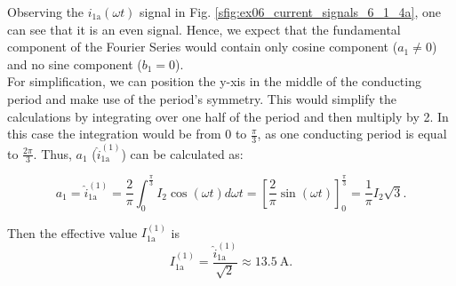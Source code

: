     \begin{solutionblock}
        
    \end{solutionblock}
    \begin{solutionblock}
        Observing the $i_\mathrm{1a}(\omega t)$ signal in Fig. \ref{sfig:ex06_current_signals_6_1_4a}, one can see that it is an even signal. Hence, we expect that the fundamental component of the Fourier Series
        would contain only cosine component ($a_1 \neq 0$) and no sine component ($b_1 = 0$). 
        \\
        For simplification, we can position the y-xis in the middle of the conducting period and make use of the period's symmetry. This would simplify the calculations
        by integrating over one half of the period and then multiply by 2. In this case the integration would be from 0 to $\frac{\pi}{3}$, as one conducting
        period is equal to $\frac{2\pi}{3}$. Thus, $a_1$ ($\hat{i}^\mathrm{(1)}_\mathrm{1a}$) can be calculated as:

        \begin{equation}
            a_1 = \hat{i}^\mathrm{(1)}_\mathrm{1a} = \frac{2}{\pi}\int_{0}^{\frac{\pi}{3}}I_\mathrm{2}\cos(\omega t) d\omega t = \left[\frac{2}{\pi} \sin(\omega t)\right]^{\frac{\pi}{3}}_{0} = \frac{1}{\pi}I_\mathrm{2}\sqrt{3}.
            \label{sub6.1.4:eq:calculate_a1}
        \end{equation}  
        
        Then the effective value $I^\mathrm{(1)}_\mathrm{1a}$ is
            \begin{equation}
                I^\mathrm{(1)}_\mathrm{1a} = \frac{\hat{i}^\mathrm{(1)}_\mathrm{1a}}{\sqrt{2}} \approx \SI{13.5}{\ampere}.
                \label{sub6.1.4:eq:calculate_I_rms}
            \end{equation}   
        

\end{solutionblock}
